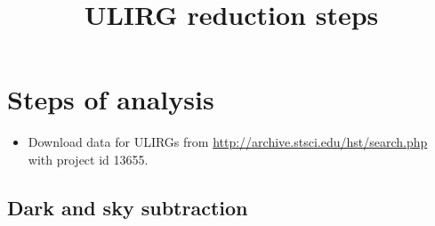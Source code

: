 \documentclass[11pt]{article}
\title{ULIRG reduction steps}
\date{}
\begin{document}
\maketitle

\tableofcontents


\section{Steps of analysis}

\begin{itemize}
\item Download data for ULIRGs from \url{http://archive.stsci.edu/hst/search.php} with project id 13655.

  
\end{itemize}
\begin{center}

\end{center}

\subsection{Dark and sky subtraction}
\end{document}
